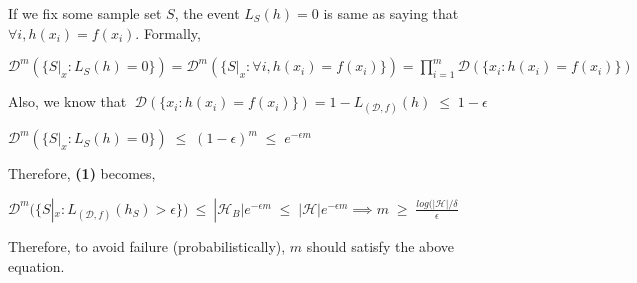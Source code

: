 \documentclass[a4paper]{article}
\begin{document}
            If we fix some sample set $S$, the event $L_S(h) = 0$ is same as saying that $\forall i, h(x_i) = f(x_i)$. Formally,
            \begin{center}
                $
                    \mathcal{D}^m(\{S|_x:L_S(h) = 0\}) =  \mathcal{D}^m(\{S|_x:\forall i, h(x_i) = f(x_i)\}) 
                    
                    = \displaystyle\prod_{i = 1}^m \mathcal{D}(\{x_i: h(x_i) = f(x_i)\})
                $
            \end{center}
            
            Also, we know that $\; \mathcal{D}(\{x_i: h(x_i) = f(x_i)\}) = 1-L_{(\mathcal{D},f)}(h) \; \leq \; 1-\epsilon$
            
            \begin{center}
                $
                    \mathcal{D}^m(\{S|_x:L_S(h) = 0\}) \; \leq \; (1-\epsilon)^m \; \leq \; e^{-\epsilon m}
                $
            \end{center}
            
            Therefore, \textbf{(1)} becomes,
            
            \begin{center}
                $
                    \mathcal{D}^m(\{S|_x: L_{(\mathcal{D},f)}(h_S) >\epsilon\}) \: \leq \: |\mathcal{H}_B|e^{-\epsilon m} \; \leq \; |\mathcal{H}|e^{-\epsilon m}
                    
                    \implies m \; \geq \; \frac{log(|\mathcal{H}|/\delta}{\epsilon} 
                $
            \end{center}
            
            Therefore, to avoid failure (probabilistically), $m$ should satisfy the above equation.
            
\end{document}
